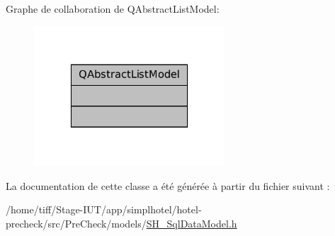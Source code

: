 Graphe de collaboration de Q\-Abstract\-List\-Model\-:\nopagebreak
\begin{figure}[H]
\begin{center}
\leavevmode
\includegraphics[width=202pt]{classQAbstractListModel__coll__graph}
\end{center}
\end{figure}


La documentation de cette classe a été générée à partir du fichier suivant \-:\begin{DoxyCompactItemize}
\item 
/home/tiff/\-Stage-\/\-I\-U\-T/app/simplhotel/hotel-\/precheck/src/\-Pre\-Check/models/\hyperlink{SH__SqlDataModel_8h}{S\-H\-\_\-\-Sql\-Data\-Model.\-h}\end{DoxyCompactItemize}

